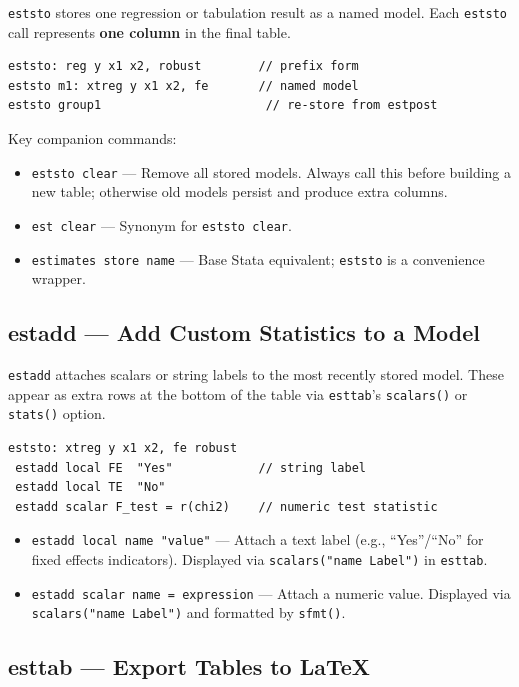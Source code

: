 \documentclass[11pt]{article}
\numberwithin{table}{section}
\begin{document}
\texttt{eststo} stores one regression or tabulation result as a named model. Each \texttt{eststo} call represents \textbf{one column} in the final table.

\begin{lstlisting}[style=stata]
eststo: reg y x1 x2, robust        // prefix form
eststo m1: xtreg y x1 x2, fe       // named model
eststo group1                       // re-store from estpost
\end{lstlisting}

Key companion commands:
\begin{itemize}
    \item \texttt{eststo clear} --- Remove all stored models. Always call this before building a new table; otherwise old models persist and produce extra columns.
    \item \texttt{est clear} --- Synonym for \texttt{eststo clear}.
    \item \texttt{estimates store name} --- Base Stata equivalent; \texttt{eststo} is a convenience wrapper.
\end{itemize}

\subsection{estadd --- Add Custom Statistics to a Model}

\texttt{estadd} attaches scalars or string labels to the most recently stored model. These appear as extra rows at the bottom of the table via \texttt{esttab}'s \texttt{scalars()} or \texttt{stats()} option.

\begin{lstlisting}[style=stata]
eststo: xtreg y x1 x2, fe robust
 estadd local FE  "Yes"            // string label
 estadd local TE  "No"
 estadd scalar F_test = r(chi2)    // numeric test statistic
\end{lstlisting}

\begin{itemize}
    \item \texttt{estadd local name "value"} --- Attach a text label (e.g., ``Yes''/``No'' for fixed effects indicators). Displayed via \texttt{scalars("name Label")} in \texttt{esttab}.
    \item \texttt{estadd scalar name = expression} --- Attach a numeric value. Displayed via \texttt{scalars("name Label")} and formatted by \texttt{sfmt()}.
\end{itemize}

\subsection{esttab --- Export Tables to LaTeX}
\end{document}
